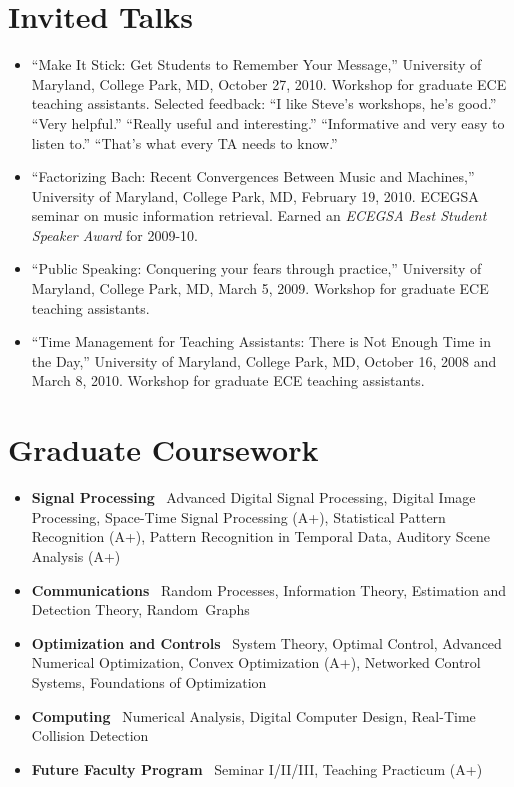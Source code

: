 \documentclass[10pt,letterpaper]{article}
\begin{document}
\section*{Invited Talks}

\begin{itemize}
\item ``Make It Stick: Get Students to Remember Your Message,'' University of Maryland, College Park, MD, October 27, 2010. Workshop for graduate ECE teaching assistants. Selected feedback: ``I like Steve's workshops, he's good.'' ``Very helpful.'' ``Really useful and interesting.'' ``Informative and very easy to listen to.'' ``That's what every TA needs to know.''
\item ``Factorizing Bach: Recent Convergences Between Music and Machines,'' University of Maryland, College Park, MD, February 19, 2010. ECEGSA seminar on music information retrieval. Earned an \textit{ECEGSA Best Student Speaker Award} for 2009-10.
\item ``Public Speaking: Conquering your fears through practice,'' University of Maryland, College Park, MD, March 5, 2009. Workshop for graduate ECE teaching assistants.
\item ``Time Management for Teaching Assistants: There is Not Enough Time in the Day,'' University of Maryland, College Park, MD, October 16, 2008 and March 8, 2010. Workshop for graduate ECE teaching assistants.
\end{itemize}


\section*{Graduate Coursework}

\begin{itemize}

\item \textbf{Signal Processing} \ Advanced Digital Signal Processing, Digital Image Processing, Space-Time Signal Processing (A+), Statistical Pattern Recognition (A+), Pattern Recognition in Temporal Data, Auditory Scene Analysis (A+)

\item \textbf{Communications} \ Random Processes, Information Theory, Estimation and Detection Theory, Random~Graphs

\item \textbf{Optimization and Controls} \ System Theory, Optimal Control, Advanced Numerical Optimization, Convex Optimization (A+), Networked Control Systems, Foundations of Optimization

\item \textbf{Computing} \ Numerical Analysis, Digital Computer Design, Real-Time Collision Detection

\item \textbf{Future Faculty Program} \ Seminar I/II/III, Teaching Practicum (A+)

\end{itemize}
\end{document}
